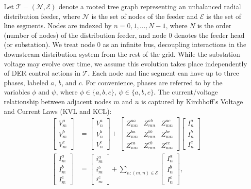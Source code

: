 Let $\mathcal{T} = (\mathcal{N}, \mathcal{E})$ denote a rooted tree graph representing an unbalanced radial distribution feeder, where $\mathcal{N}$ is the set of nodes of the feeder and $\mathcal{E}$ is the set of line segments. Nodes are indexed by $n = 0,1,\dots,N-1$, where $N$ is the order (number of nodes) of the distribution feeder, and node 0 denotes the feeder head (or substation). We treat node 0 as an infinite bus, decoupling interactions in the downstream distribution system from the rest of the grid. While the substation voltage may evolve over time, we assume this evolution takes place independently of DER control actions in $\mathcal{T}$. Each node and line segment can have up to three phases, labeled $a$, $b$, and $c$. For convenience, phases are referred to by the variables $\phi$ and $\psi$, where $\phi \in \{a,b,c \}$, $\psi \in \{a,b,c \}$. The current/voltage relationship between adjacent nodes $m$ and $n$ is captured by Kirchhoff's Voltage and Current Laws (KVL and KCL):
\begin{align}
	\begin{bmatrix}
		V_{m}^{a} \\
		V_{m}^{b} \\
		V_{m}^{c}
	\end{bmatrix}
	&=
	\begin{bmatrix}
		V_{n}^{a} \\
		V_{n}^{b} \\
		V_{n}^{c}
	\end{bmatrix}
	+
	\begin{bmatrix}
		Z^{aa}_{mn} & Z^{ab}_{mn} & Z^{ac}_{mn} \\
		Z^{ba}_{mn} & Z^{bb}_{mn} & Z^{bc}_{mn} \\
		Z^{ca}_{mn} & Z^{cb}_{mn} & Z^{cc}_{mn}
	\end{bmatrix}
	\begin{bmatrix}
		I_{n}^{a} \\
		I_{n}^{b} \\
		I_{n}^{c}
	\end{bmatrix} \label{eq:KVL}
\\
\begin{bmatrix}
		I_{m}^{a} \\
		I_{m}^{b} \\
		I_{m}^{c}
	\end{bmatrix}
	&= \begin{bmatrix}
		i_{m}^{a} \\
		i_{m}^{b} \\
		i_{m}^{c}
	\end{bmatrix} + \sum_{n:(m,n) \in \mathcal{E}}
	\begin{bmatrix}
		I_{n}^{a} \\
		I_{n}^{b} \\
		I_{n}^{c}
	\end{bmatrix}\label{eq:KCL},
\end{align}
